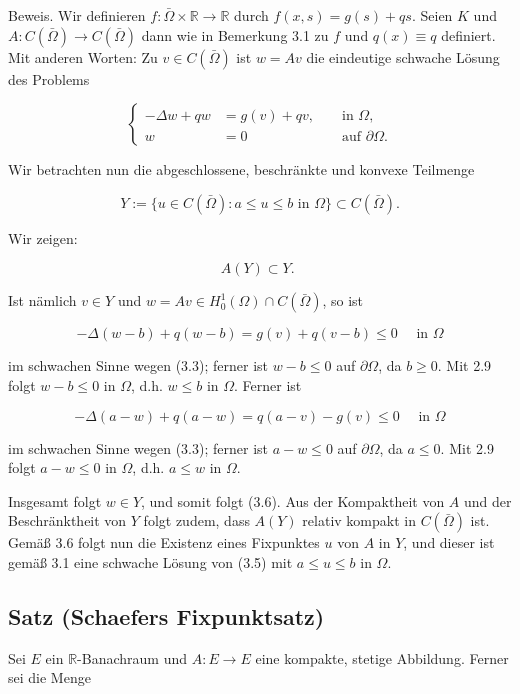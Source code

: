 \documentclass[10pt, letterpaper]{article}
\begin{document}
Beweis. Wir definieren $f: \bar{\Omega} \times \mathbb{R} \rightarrow \mathbb{R}$ durch $f(x, s)=g(s)+q s$. Seien $K$ und $A: C(\bar{\Omega}) \rightarrow C(\bar{\Omega})$ dann wie in Bemerkung 3.1 zu $f$ und $q(x) \equiv q$ definiert. Mit anderen Worten: Zu $v \in C(\bar{\Omega})$ ist $w=A v$ die eindeutige schwache Lösung des Problems

$$
\left\{\begin{aligned}
-\Delta w+q w & =g(v)+q v, & & \text { in } \Omega, \\
w & =0 & & \text { auf } \partial \Omega .
\end{aligned}\right.
$$

Wir betrachten nun die abgeschlossene, beschränkte und konvexe Teilmenge

$$
Y:=\{u \in C(\bar{\Omega}): a \leq u \leq b \text { in } \Omega\} \subset C(\bar{\Omega}) .
$$

Wir zeigen:

$$
A(Y) \subset Y \text {. }
$$

Ist nämlich $v \in Y$ und $w=A v \in H_{0}^{1}(\Omega) \cap C(\bar{\Omega})$, so ist

$$
-\Delta(w-b)+q(w-b)=g(v)+q(v-b) \leq 0 \quad \text { in } \Omega
$$

im schwachen Sinne wegen (3.3); ferner ist $w-b \leq 0$ auf $\partial \Omega$, da $b \geq 0$. Mit 2.9 folgt $w-b \leq 0$ in $\Omega$, d.h. $w \leq b$ in $\Omega$. Ferner ist

$$
-\Delta(a-w)+q(a-w)=q(a-v)-g(v) \leq 0 \quad \text { in } \Omega
$$

im schwachen Sinne wegen (3.3); ferner ist $a-w \leq 0$ auf $\partial \Omega$, da $a \leq 0$. Mit 2.9 folgt $a-w \leq 0$ in $\Omega$, d.h. $a \leq w$ in $\Omega$.

Insgesamt folgt $w \in Y$, und somit folgt (3.6). Aus der Kompaktheit von $A$ und der Beschränktheit von $Y$ folgt zudem, dass $A(Y)$ relativ kompakt in $C(\bar{\Omega})$ ist. Gemäß 3.6 folgt nun die Existenz eines Fixpunktes $u$ von $A$ in $Y$, und dieser ist gemäß 3.1 eine schwache Lösung von (3.5) mit $a \leq u \leq b$ in $\Omega$.

\subsection*{Satz (Schaefers Fixpunktsatz)}

Sei $E$ ein $\mathbb{R}$-Banachraum und $A: E \rightarrow E$ eine kompakte, stetige Abbildung. Ferner sei die Menge
\end{document}
